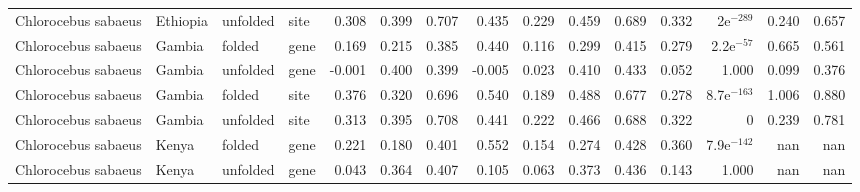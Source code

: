 \begin{longtable}{llllrrrrrrrrrrr}
 Chlorocebus sabaeus &                  Ethiopia &  unfolded &  site &                              0.308 &                               0.399 &                 0.707 &                 0.435 &                              0.229 &                               0.459 &                 0.689 &                 0.332 &   2e$^{-289}$ &  0.240 &  0.657 \\
 Chlorocebus sabaeus &                    Gambia &    folded &  gene &                              0.169 &                               0.215 &                 0.385 &                 0.440 &                              0.116 &                               0.299 &                 0.415 &                 0.279 &  2.2e$^{-57}$ &  0.665 &  0.561 \\
 Chlorocebus sabaeus &                    Gambia &  unfolded &  gene &                             -0.001 &                               0.400 &                 0.399 &                -0.005 &                              0.023 &                               0.410 &                 0.433 &                 0.052 &         1.000 &  0.099 &  0.376 \\
 Chlorocebus sabaeus &                    Gambia &    folded &  site &                              0.376 &                               0.320 &                 0.696 &                 0.540 &                              0.189 &                               0.488 &                 0.677 &                 0.278 & 8.7e$^{-163}$ &  1.006 &  0.880 \\
 Chlorocebus sabaeus &                    Gambia &  unfolded &  site &                              0.313 &                               0.395 &                 0.708 &                 0.441 &                              0.222 &                               0.466 &                 0.688 &                 0.322 &             0 &  0.239 &  0.781 \\
 Chlorocebus sabaeus &                     Kenya &    folded &  gene &                              0.221 &                               0.180 &                 0.401 &                 0.552 &                              0.154 &                               0.274 &                 0.428 &                 0.360 & 7.9e$^{-142}$ &    nan &    nan \\
 Chlorocebus sabaeus &                     Kenya &  unfolded &  gene &                              0.043 &                               0.364 &                 0.407 &                 0.105 &                              0.063 &                               0.373 &                 0.436 &                 0.143 &         1.000 &    nan &    nan \\

\end{longtable}

